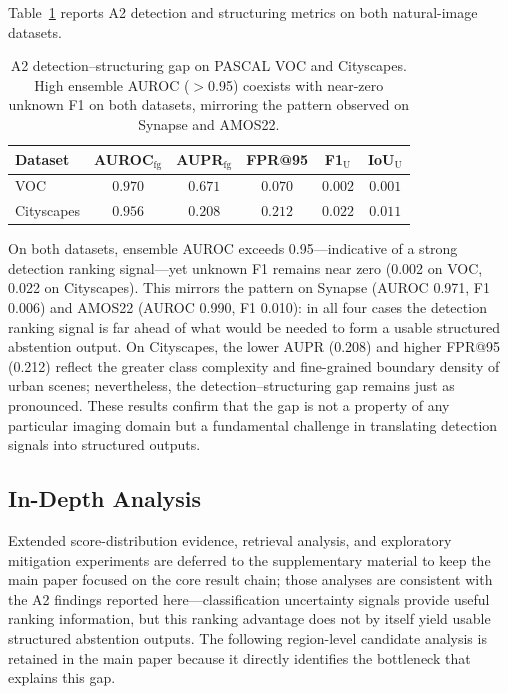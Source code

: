 \documentclass[journal]{IEEEtai}
\begin{document}
Table~\ref{tab:crossdomain_a2} reports A2 detection and structuring metrics on both
natural-image datasets.

\begin{table}[!t]
\centering
\caption{A2 detection--structuring gap on PASCAL VOC and Cityscapes.
High ensemble AUROC ($>$0.95) coexists with near-zero unknown F1 on both datasets,
mirroring the pattern observed on Synapse and AMOS22.}
\label{tab:crossdomain_a2}
\footnotesize
\begin{tabular}{l ccc cc}
\toprule
Dataset & AUROC$_{\text{fg}}$ & AUPR$_{\text{fg}}$ & FPR@95 & F1$_{\text{U}}$ & IoU$_{\text{U}}$ \\
\midrule
VOC        & $0.970$ & $0.671$ & $0.070$ & $0.002$ & $0.001$ \\
Cityscapes & $0.956$ & $0.208$ & $0.212$ & $0.022$ & $0.011$ \\
\bottomrule
\end{tabular}
\end{table}

On both datasets, ensemble AUROC exceeds 0.95---indicative of a strong detection
ranking signal---yet unknown F1 remains near zero (0.002 on VOC, 0.022 on Cityscapes).
This mirrors the pattern on Synapse (AUROC 0.971, F1 0.006) and AMOS22 (AUROC 0.990,
F1 0.010): in all four cases the detection ranking signal is far ahead of what would be
needed to form a usable structured abstention output.
On Cityscapes, the lower AUPR (0.208) and higher FPR@95 (0.212) reflect the greater
class complexity and fine-grained boundary density of urban scenes; nevertheless, the
detection--structuring gap remains just as pronounced.
These results confirm that the gap is not a property of any particular imaging domain
but a fundamental challenge in translating detection signals into structured outputs.

\subsection{In-Depth Analysis}\label{sec:exp:analysis}

Extended score-distribution evidence, retrieval analysis, and exploratory mitigation
experiments are deferred to the supplementary material to keep the main paper focused
on the core result chain; those analyses are consistent with the A2 findings reported
here---classification uncertainty signals provide useful ranking information, but this
ranking advantage does not by itself yield usable structured abstention outputs.
The following region-level candidate analysis is retained in the main paper because it
directly identifies the bottleneck that explains this gap.
\end{document}
